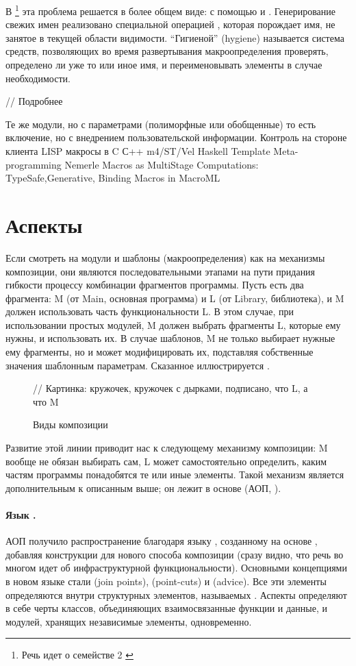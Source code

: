 {В \footnote{Речь идет о семействе  2 \cite{???}} эта проблема решается в более общем виде: с помощью  и . Генерирование свежих имен реализовано специальной операцией , которая порождает имя, не занятое в текущей области видимости. ``Гигиеной'' (hygiene) называется система средств, позволяющих во время развертывания макроопределения проверять, определено ли уже то или иное имя, и переименовывать элементы в случае необходимости.

// Подробнее



Те же модули, но с параметрами (полиморфные или обобщенные)
	то есть включение, но с внедрением пользовательской информации. Контроль на стороне клиента
	LISP
	макросы в C
	С++
	m4/ST/Vel
	Haskell Template Meta-programming
	Nemerle
	Macros as MultiStage Computations: TypeSafe,Generative, Binding Macros in MacroML
}	
\section{Аспекты}

Если смотреть на модули и шаблоны (макроопределения) как на механизмы композиции, они являются последовательными этапами на пути придания гибкости процессу комбинации фрагментов программы. Пусть есть два фрагмента: M (от Main, основная программа) и L (от Library, библиотека), и M должен использовать часть функциональности L. В этом случае, при использовании простых модулей, M должен выбрать фрагменты L, которые ему нужны, и использовать их. В случае шаблонов, M не только выбирает нужные ему фрагменты, но и может модифицировать их, подставляя собственные значения шаблонным параметрам. Сказанное иллюстрируется .

\begin{figure}[htbp]
// Картинка: кружочек, кружочек с дырками, подписано, что L, а что M
\caption{Виды композиции}\label{Composition}
\end{figure}

Развитие этой линии приводит нас к следующему механизму композиции: M вообще не обязан выбирать сам, L может самостоятельно определить, каким частям программы понадобятся те или иные элементы. Такой механизм является дополнительным к описанным выше; он лежит в основе  (АОП, \cite{AOP}).

\paragraph*{Язык .} АОП получило распространение благодаря языку  \cite{AspectJ}, созданному на основе , добавляя конструкции для нового способа композиции (сразу видно, что речь во многом идет об инфраструктурной функциональности). Основными концепциями в новом языке стали  (join points),  (point-cuts) и  (advice). Все эти элементы определяются внутри структурных элементов, называемых . Аспекты определяют в себе черты классов, объединяющих взаимосвязанные функции и данные, и модулей, хранящих независимые элементы, одновременно.

